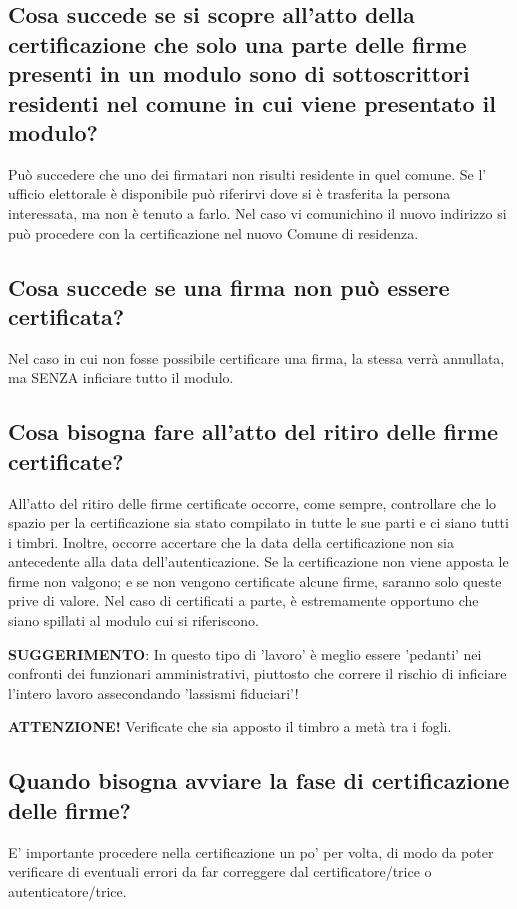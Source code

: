 \documentclass[paper=a4,11pt]{scrartcl}
\begin{document}
\subsection{Cosa succede se si scopre all’atto della certificazione che solo una parte 
delle firme presenti in un modulo sono di sottoscrittori residenti nel comune 
in cui viene presentato il modulo?}

Può succedere che uno dei firmatari non risulti residente in quel comune. Se l’
ufficio elettorale è disponibile può riferirvi dove si è trasferita la persona 
interessata, ma non è tenuto a farlo. Nel caso vi comunichino il nuovo 
indirizzo si può procedere con la certificazione nel nuovo Comune di residenza.

\subsection{Cosa succede se una firma non può essere certificata?}
Nel caso in cui non fosse possibile certificare una firma, la stessa verrà 
annullata, ma SENZA inficiare tutto il modulo.

\subsection{Cosa bisogna fare all’atto del ritiro delle firme certificate?}
All’atto del ritiro delle firme certificate occorre, come sempre, controllare 
che lo spazio per la certificazione sia stato compilato in tutte le sue parti e 
ci siano tutti i timbri. Inoltre, occorre accertare che la data della 
certificazione non sia antecedente alla data dell’autenticazione.
Se la certificazione non viene apposta le firme non valgono; e se non vengono 
certificate alcune firme, saranno solo queste prive di valore. Nel caso di 
certificati a parte, è estremamente opportuno che siano spillati al modulo cui 
si riferiscono.

\textbf{SUGGERIMENTO}: In questo tipo di 'lavoro' è meglio essere 'pedanti' nei 
confronti dei funzionari amministrativi, piuttosto che correre il rischio di 
inficiare l'intero lavoro assecondando 'lassismi fiduciari'!

\begin{leftbar}\textbf{ATTENZIONE!} Verificate che sia apposto il timbro a metà tra i fogli.\end{leftbar}

\subsection{Quando bisogna avviare la fase di certificazione delle firme?}
E' importante procedere nella certificazione un po’ per volta, di modo da 
poter verificare di eventuali errori da far correggere dal certificatore/trice 
o autenticatore/trice.
\end{document}
